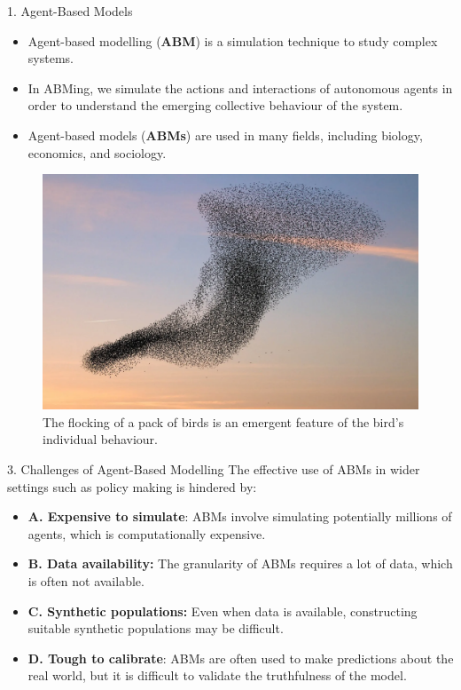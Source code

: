 \documentclass[final,hyperref={pdfpagelabels=false}]{beamer}
\newcommand{\shrink}{-15pt}
\begin{document}
\begin{frame}[t]
\begin{columns}[t]
\begin{column}{.48\textwidth}
    \vspace{\shrink}          
    \begin{block}{1. Agent-Based Models}
      \begin{itemize}
          \item Agent-based modelling (\textbf{ABM}) is a simulation technique to study complex systems.
          \item In ABMing, we simulate the actions and interactions of autonomous agents in order to understand the emerging collective behaviour of the system.
          \item Agent-based models (\textbf{ABMs}) are used in many fields, including biology, economics, and sociology.
      \end{itemize}
      \begin{figure}
        \centering
        \includegraphics[width=0.7\columnwidth]{figures/birds}
        \caption{\footnotesize The flocking of a pack of birds is an emergent feature of the bird's individual behaviour.}
      \end{figure}
    \end{block}
    \begin{block}{3. Challenges of Agent-Based Modelling}
      The effective use of ABMs in wider settings such as policy making is hindered by:
      \begin{itemize}
        \item\justifying \textbf{A. Expensive to simulate}: ABMs involve simulating potentially millions of agents, which is computationally expensive.
        \item\justifying \textbf{B. Data availability:} The granularity of ABMs requires a lot of data, which is often not available. 
        \item \justifying \textbf{C. Synthetic populations: } Even when data is available, constructing suitable synthetic populations may be difficult.
        \item\justifying\textbf{D. Tough to calibrate}: ABMs are often used to make predictions about the real world, but it is difficult to validate the truthfulness of the model.

\end{itemize}
\end{block}
\end{column}
\end{columns}
\end{frame}
\end{document}
